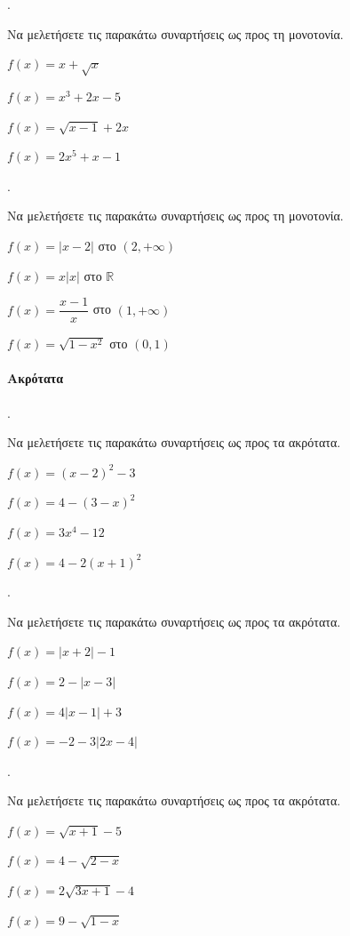 \documentclass[11pt,a4paper,twocolumn]{article}
\newcounter{askhsh}
\newcommand{\askhsh}{\large\theaskhsh.\ \addtocounter{askhsh}{1}}
\begin{document}
\askhsh Να μελετήσετε τις παρακάτω συναρτήσεις ως προς τη μονοτονία.
\begin{alist}
    \item $f(x)=x+\sqrt{x}$
    \item $f(x)=x^3+2x-5$
    \item $f(x)=\sqrt{x-1}+2x$
    \item $f(x)=2x^5+x-1$
\end{alist}
\askhsh Να μελετήσετε τις παρακάτω συναρτήσεις ως προς τη μονοτονία.
\begin{alist}
    \item $f(x)=|x-2|$ στο $(2,+\infty)$
    \item $f(x)=x|x|$ στο $\mathbb{R}$
    \item $f(x)=\dfrac{x-1}{x}$ στο $(1,+\infty)$
    \item $f(x)=\sqrt{1-x^2}$ στο $(0,1)$
\end{alist}
\paragraph{Ακρότατα}
\askhsh Να μελετήσετε τις παρακάτω συναρτήσεις ως προς τα ακρότατα.
\begin{alist}
\item $f(x)=(x-2)^2-3$
\item $f(x)=4-(3-x)^2$
\item $f(x)=3x^4-12$
\item $f(x)=4-2(x+1)^2$
\end{alist}
\askhsh Να μελετήσετε τις παρακάτω συναρτήσεις ως προς τα ακρότατα.
\begin{alist}
\item $f(x)=|x+2|-1$
\item $f(x)=2-|x-3|$
\item $f(x)=4|x-1|+3$
\item $f(x)=-2-3|2x-4|$
\end{alist}
\askhsh Να μελετήσετε τις παρακάτω συναρτήσεις ως προς τα ακρότατα.
\begin{alist}
\item $f(x)=\sqrt{x+1}-5$
\item $f(x)=4-\sqrt{2-x}$
\item $f(x)=2\sqrt{3x+1}-4$
\item $f(x)=9-\sqrt{1-x}$
\end{alist}
\end{document}

